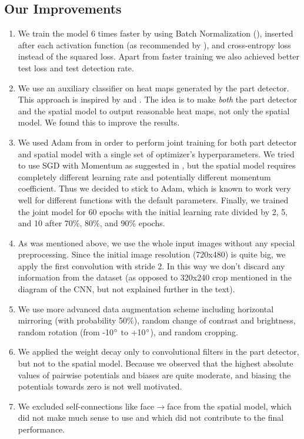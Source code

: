 \documentclass[a4paper,10pt]{article}
\begin{document}
	
	\subsection{Our Improvements}
	\begin{enumerate}
		\item We train the model 6 times faster by using Batch Normalization (\cite{ioffe2015batch}), inserted after each activation function (as recommended by \cite{mishkin2017systematic}), and cross-entropy loss instead of the squared loss. Apart from faster training we also achieved better test loss and test detection rate.
		\item We use an auxiliary classifier on heat maps generated by the part detector. This approach is inspired by \cite{girshick2015fast} and \cite{conv_pose_machines}. The idea is to make \textit{both} the part detector and the spatial model to output reasonable heat maps, not only the spatial model. We found this to improve the results.
		\item We used Adam from \cite{adam} in order to perform joint training for both part detector and spatial model with a single set of optimizer's hyperparameters. We tried to use SGD with Momentum as suggested in \cite{cnn_pgm_for_hpe}, but the spatial model requires completely different learning rate and potentially different momentum coefficient. Thus we decided to stick to Adam, which is known to work very well for different functions with the default parameters. Finally, we trained the joint model for 60 epochs with the initial learning rate divided by 2, 5, and 10 after 70\%, 80\%, and 90\% epochs.
		\item As was mentioned above, we use the whole input images without any special preprocessing. Since the initial image resolution (720x480) is quite big, we apply the first convolution with stride 2. In this way we don't discard any information from the dataset (as opposed to 320x240 crop mentioned in the diagram of the CNN, but not explained further in the text).	
		\item We use more advanced data augmentation scheme including horizontal mirroring (with probability 50\%), random change of contrast and brightness, random rotation (from -10$\degree$ to +10$\degree$), and random cropping.
		\item We applied the weight decay only to convolutional filters in the part detector, but not to the spatial model. Because we observed that the highest absolute values of pairwise potentials and biases are quite moderate, and biasing the potentials towards zero is not well motivated.	
		\item We excluded self-connections like face$\rightarrow$face from the spatial model, which did not make much sense to use and which did not contribute to the final performance.
	\end{enumerate}
\end{document}

